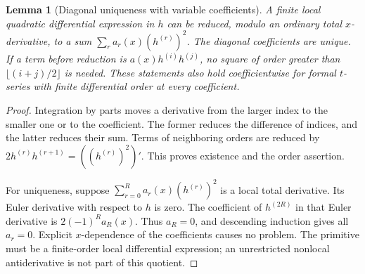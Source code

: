 \documentclass[11pt,letterpaper]{article}
\numberwithin{equation}{section}
\newtheorem{lemma}[theorem]{Lemma}
\theoremstyle{definition}\newtheorem{definition}[theorem]{Definition}
\theoremstyle{remark}\newtheorem{remark}[theorem]{Remark}
\begin{document}
\begin{lemma}[Diagonal uniqueness with variable coefficients]
\label{ubg:lem:diagonal}
A finite local quadratic differential expression in $h$ can be reduced,
modulo an ordinary total $x$-derivative, to a sum
$\sum_r a_r(x)(h^{(r)})^2$. The diagonal coefficients are unique.
If a term before reduction is $a(x)h^{(i)}h^{(j)}$, no square of
order greater than $\lfloor(i+j)/2\rfloor$ is needed.
These statements also hold coefficientwise for formal $t$-series
with finite differential order at every coefficient.
\end{lemma}
\begin{proof}
Integration by parts moves a derivative from the larger index to the
smaller one or to the coefficient. The former reduces the difference
of indices, and the latter reduces their sum. Terms of neighboring
orders are reduced by
$2h^{(r)}h^{(r+1)}=((h^{(r)})^2)'$.
This proves existence and the order assertion.

For uniqueness, suppose $\sum_{r=0}^R a_r(x)(h^{(r)})^2$ is a local
total derivative. Its Euler derivative with respect to $h$ is zero.
The coefficient of $h^{(2R)}$ in that Euler derivative is
$2(-1)^R a_R(x)$. Thus $a_R=0$, and descending induction gives all
$a_r=0$. Explicit $x$-dependence of the coefficients causes no problem.
The primitive must be a finite-order local differential expression;
an unrestricted nonlocal antiderivative is not part of this quotient.
\end{proof}
\end{document}
